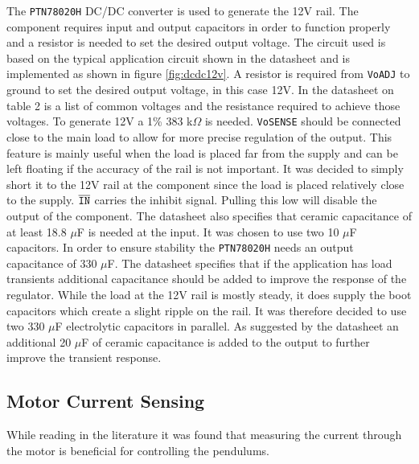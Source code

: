 The \texttt{PTN78020H} DC/DC converter is used to generate the 12V rail. 
The component requires input and output capacitors in order to function properly and a resistor is needed to set the desired output voltage. 
The circuit used is based on the typical application circuit shown in the datasheet \cite{PTN78020H} and is implemented as shown in figure \ref{fig:dcdc12v}.
A resistor is required from \texttt{VoADJ} to ground to set the desired output voltage, in this case 12V.
In the datasheet on table 2 is a list of common voltages and the resistance required to achieve those voltages.
To generate 12V a 1\% 383 k$\Omega$ is needed.
\texttt{VoSENSE} should be connected close to the main load to allow for more precise regulation of the output.
This feature is mainly useful when the load is placed far from the supply and can be left floating if the accuracy of the rail is not important.
It was decided to simply short it to the 12V rail at the component since the load is placed relatively close to the supply.
$\overline{\text{\texttt{IN}}}$ carries the inhibit signal.
Pulling this low will disable the output of the component.
The datasheet also specifies that ceramic capacitance of at least 18.8 $\mu$F is needed at the input. 
It was chosen to use two 10 $\mu$F capacitors.
In order to ensure stability the \texttt{PTN78020H} needs an output capacitance of 330 $\mu$F.
The datasheet specifies that if the application has load transients additional capacitance should be added to improve the response of the regulator.
While the load at the 12V rail is mostly steady, it does supply the boot capacitors which create a slight ripple on the rail.
It was therefore decided to use two 330 $\mu$F electrolytic capacitors in parallel.
As suggested by the datasheet an additional 20 $\mu$F of ceramic capacitance is added to the output to further improve the transient response.\\



\subsection{Motor Current Sensing}
While reading in the literature it was found that measuring the current through the motor is beneficial for controlling the pendulums.

